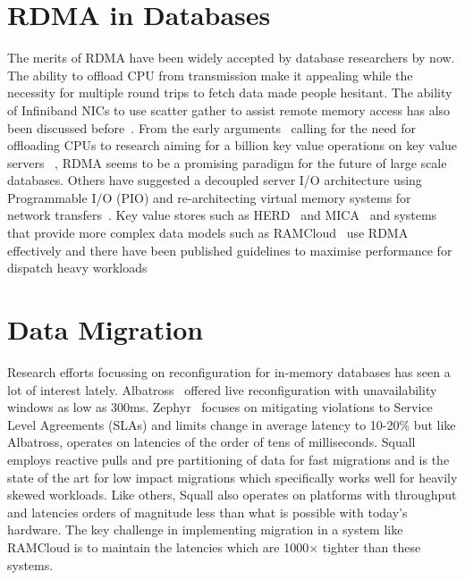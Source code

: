 \section{RDMA in Databases}
The merits of RDMA have been widely accepted by database researchers by now. The 
ability to offload CPU from transmission make it appealing while the necessity for 
multiple round trips to fetch data made people hesitant. The ability of Infiniband NICs to 
use scatter gather to assist remote memory access has also been discussed before~\cite{zerocopy04}.
From the early arguments~\cite{rdmacase} calling for the need for offloading CPUs to 
research aiming for a billion key value operations on key value servers ~\cite{rdmabillion},
RDMA seems to be a promising paradigm for the future of large scale databases. Others have suggested
a decoupled server I/O architecture using Programmable I/O (PIO) and re-architecting virtual 
memory systems for network transfers~\cite{hicamp}. Key value stores
such as HERD~\cite{herd} and MICA~\cite{mica} and systems that provide more complex
data models such as RAMCloud~\cite{ramcloud} use RDMA effectively and there have been 
published guidelines to maximise performance for dispatch heavy workloads~\cite{rdma}
\newpage
\section{Data Migration}
Research efforts focussing on reconfiguration for in-memory databases has seen a lot of 
interest lately. Albatross~\cite{albatross} offered live reconfiguration with unavailability windows as low as 
300ms. Zephyr~\cite{zephyr} focuses on mitigating violations to Service Level Agreements (SLAs) and limits 
change in average latency to 10-20\% but like Albatross, operates on latencies of the order of tens of milliseconds.  
Squall~\cite{squall} employs reactive pulls and pre partitioning
of data for fast migrations and is the state of the art for low impact migrations which specifically works well for 
heavily skewed workloads. Like others, Squall also operates on platforms with throughput and latencies orders of 
magnitude less than what is possible with today's hardware. The key challenge in implementing migration in a system 
like RAMCloud is to maintain the latencies which are 1000$\times$ tighter than these systems.

